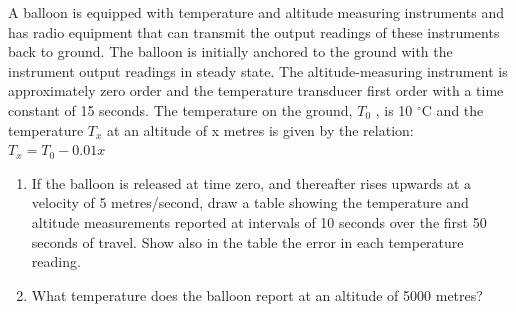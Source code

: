 \documentclass[a4paper,11pt]{book}
\begin{document}
\begin{question}[subtitle=Example on $1_{\rm st}$-order device]
A balloon is equipped with temperature and altitude measuring instruments and has radio
equipment that can transmit the output readings of these instruments back to ground. The
balloon is initially anchored to the ground with the instrument output readings in steady state.
The altitude-measuring instrument is approximately zero order and the temperature transducer
first order with a time constant of 15 seconds. The temperature on the ground, $T_0$ , is 10 $^{\circ}$C and the temperature $T_x$  at an altitude of x metres is
given by the relation: \\
$T_x = T_0 - 0.01x$

\begin{enumerate}
\item If the balloon is released at time zero, and thereafter rises upwards at a velocity of 5 metres/second, draw a table showing the temperature and altitude measurements reported
at intervals of 10 seconds over the first 50 seconds of travel. Show also in the table the
error in each temperature reading.
\item  What temperature does the balloon report at an altitude of 5000 metres?
\end{enumerate}

\examspace*{10em}

\end{question}
\begin{solution}


\end{solution}
\end{document}
